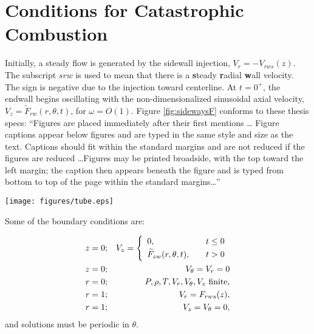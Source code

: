 \section{Conditions for Catastrophic Combustion}
\label{sec:cata}

Initially, a steady flow is generated by the sidewall
injection, $V_r = -V_{rws}(z)$.
The subscript $srw$ is used to mean that there is a
{\bf s}teady {\bf r}adial {\bf w}all velocity.
The sign is negative due to the injection toward centerline.
At $t=0^+$, the endwall begins oscillating with the
non-dimensionalized sinusoidal axial velocity,
$V_z=\widetilde{F}_{rw}(r,\theta,t)$,
for $\omega = O(1)$.
Figure \ref{fig:sidewaysF} conforms to these thesis specs:
``Figures are placed immediately after their first mentions \ldots
Figure captions appear below figures and are typed in the same
style and size as the text.  Captions should fit within the
standard margins and are not reduced if the figures are reduced
\ldots Figures may be printed broadside, with the top toward the
left margin; the caption then appears beneath the figure and is
typed from bottom to top of the page within the standard
margins\ldots''

\begin{sidewaysfigure}
\centerline{\texttt{[image: figures/tube.eps]}}
\caption[A Sideways Figure]{
	If a figure must appear sideways in a thesis
	(for greater detail) then the caption must still
	appear \emph{below} the figure --- i.e., along
	the right edge of the page.
	By including the \emph{rotating} package at the top of the
	\LaTeX{} file, you can get this rotated figure by using the
	{\tt $\backslash$begin$\{$sidewaysfigure$\}$} \ldots
	{\tt $\backslash$end$\{$sidewaysfigure$\}$} environment.
	}
\label{fig:sidewaysF}
\end{sidewaysfigure}



Some of the boundary conditions are:

\begin{eqnarray}
  z=0; && V_z = \twochoices
	{0, && t\leq0}
	{\widetilde{F}_{zw}(r,\theta,t), && t>0}
						\label{eq:endwall} \\
  z=0; && V_{\theta}=V_r=0			\label{eq:endnoslip} \\
  r=0; && P,\rho,T,V_r,\vth,V_z~\mbox{finite},	\label{eq:centerline} \\
  r=1; && V_r= F_{rws}(z),			\label{eq:injection} \\
  r=1; && V_z=\vth =0,				\label{eq:sidenoslip}
\end{eqnarray}
and solutions must be periodic in $\theta$.


